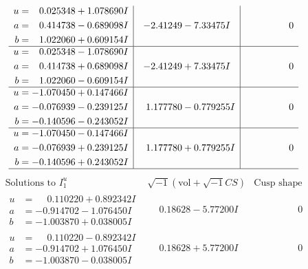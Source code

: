 \documentclass[1p]{elsarticle_modified}
\theoremstyle{definition}
\newcommand{\I}{\sqrt{-1}}
\begin{document}
$$\begin{array}{c|c|c}
\begin{aligned}
u &= \phantom{-}0.025348 + 1.078690 I \\
a &= \phantom{-}0.414738 - 0.689098 I \\
b &= \phantom{-}1.022060 + 0.609154 I\end{aligned}
 & -2.41249 - 7.33475 I & \phantom{-0.000000 } 0 \\ \hline\begin{aligned}
u &= \phantom{-}0.025348 - 1.078690 I \\
a &= \phantom{-}0.414738 + 0.689098 I \\
b &= \phantom{-}1.022060 - 0.609154 I\end{aligned}
 & -2.41249 + 7.33475 I & \phantom{-0.000000 } 0 \\ \hline\begin{aligned}
u &= -1.070450 + 0.147466 I \\
a &= -0.076939 - 0.239125 I \\
b &= -0.140596 - 0.243052 I\end{aligned}
 & \phantom{-}1.177780 - 0.779255 I & \phantom{-0.000000 } 0 \\ \hline\begin{aligned}
u &= -1.070450 - 0.147466 I \\
a &= -0.076939 + 0.239125 I \\
b &= -0.140596 + 0.243052 I\end{aligned}
 & \phantom{-}1.177780 + 0.779255 I & \phantom{-0.000000 } 0\\
 \hline 
 \end{array}$$\newpage$$\begin{array}{c|c|c}  
\text{Solutions to }I^u_{1}& \I (\text{vol} + \sqrt{-1}CS) & \text{Cusp shape}\\
 \hline 
\begin{aligned}
u &= \phantom{-}0.110220 + 0.892342 I \\
a &= -0.914702 - 1.076450 I \\
b &= -1.003870 + 0.038005 I\end{aligned}
 & \phantom{-}0.18628 - 5.77200 I & \phantom{-0.000000 } 0 \\ \hline\begin{aligned}
u &= \phantom{-}0.110220 - 0.892342 I \\
a &= -0.914702 + 1.076450 I \\
b &= -1.003870 - 0.038005 I\end{aligned}
 & \phantom{-}0.18628 + 5.77200 I & \phantom{-0.000000 } 0 \\ \hline\begin{aligned}

\end{aligned}
\end{array}$$
\end{document}
